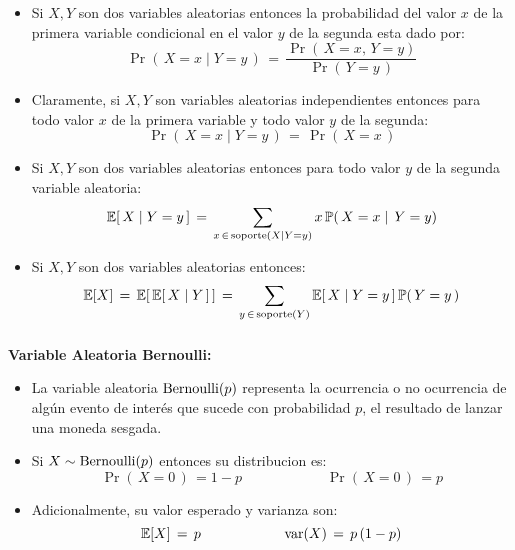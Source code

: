 \documentclass[ 10pt, xcolor = dvipsnames]{beamer}
\begin{document}
\begin{frame}[allowframebreaks]
\frametitle{\insertsection}

\begin{itemize}
\item Si $X,Y$ son dos variables aleatorias entonces la probabilidad del valor $x$ de la primera variable condicional en el valor $y$ de la segunda esta dado por: 
\[
\Pr( \, X = x \mid Y = y \, ) \, = \, 
\frac{ \Pr( \, X = x, \, Y = y ) }{ \Pr( \, Y = y \, ) }
\]
\item Claramente, si $X,Y$ son variables aleatorias independientes entonces para todo valor $x$ de la primera variable y todo valor $y$ de la segunda: 
\[
\Pr( \, X = x \mid Y = y \, ) \, = \, \Pr( \, X = x \, )
\]
\framebreak
\item Si $X,Y$ son dos variables aleatorias entonces para todo valor $y$ de la \linebreak segunda variable aleatoria: 
\[
\mathbb{E}[ \, X \mid Y  = y \, ] \, = \, \sum_{ x \, \in \, \text{soporte}( X \mid Y = y ) } x \, \mathbb{P}( \, X = x \mid \, Y = y )
\]
\item Si $X,Y$ son dos variables aleatorias entonces: 
\[
\mathbb{E}[X] \, = \, \mathbb{E}[ \, \mathbb{E}[ \, X \mid Y \, ] \, ] \, = \, 
\sum_{ y \, \in \, \text{soporte}(Y) } \mathbb{E}[ \, X \mid Y = y \, ] \,
\mathbb{P}( \, Y = y \, )
\]

\end{itemize}

\end{frame}

\begin{frame}[allowframebreaks]
\frametitle{\insertsection}

\textbf{Variable Aleatoria Bernoulli:}
\begin{itemize}
\item La variable aleatoria $\text{Bernoulli}(p)$ representa la ocurrencia o no ocurrencia \linebreak de alg\'un evento de inter\'es que sucede con probabilidad $p$, \eg el resultado de lanzar una moneda sesgada. 
\item Si $X \sim \text{Bernoulli}(p)$ entonces su distribucion es: 
\[
\Pr( \, X = 0 \, ) \, = 1 - p \qquad \qquad \qquad
\Pr( \, X = 0 \, ) \, = p
\]
\item Adicionalmente, su valor esperado y varianza son: 
\[
\mathbb{E}[X] \, = \, p \qquad \qquad \qquad
\text{var}(X) \, = \, p \, (1-p)
\]
\end{itemize}

\end{frame}
\end{document}

